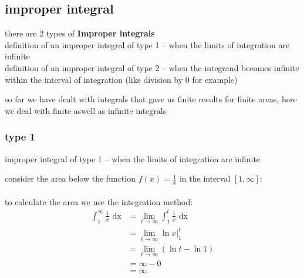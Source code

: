 \documentclass[a4paper,12pt]{article}
\newcommand{\?}{\stackrel{?}{=}}
\begin{document}
\subsection{improper integral}
\label{sec:org5ea3649}
\begin{definition}
there are 2 types of \textbf{Improper integrals}\\[0pt]
definition of an improper integral of type 1 – when the limits of integration are infinite\\[0pt]
definition of an improper integral of type 2 – when the integrand becomes infinite within the interval of integration (like division by 0 for example)\\[0pt]
\begin{note}
so far we have dealt with integrals that gave us finite results for finite areas, here we deal with finite aswell as infinite integrals\\[0pt]
\end{note}
\end{definition}
\subsubsection{type 1}
\label{sec:orgf14a419}
\begin{definition}
improper integral of type 1 – when the limits of integration are infinite\\[0pt]

\begin{my_example}
consider the area below the function \(f(x)=\frac1x\) in the interval \([1,\infty]\):\\[0pt]

\\[0pt]

to calculate the area we use the integration method:\\[0pt]
\begin{align*}
  \int_1^\infty \frac1x \text{ dx} &= \lim_{t\to\infty} \int_1^t \frac1x \text{ dx}\\
  &= \lim_{t\to\infty} \ln{x} \Big|_1^t\\
  &= \lim_{t\to\infty}\left(\ln{t} - \ln{1}\right)\\
  &= \infty - 0\\
  &= \infty\\
\end{align*}
\end{my_example}
\end{definition}
\end{document}
